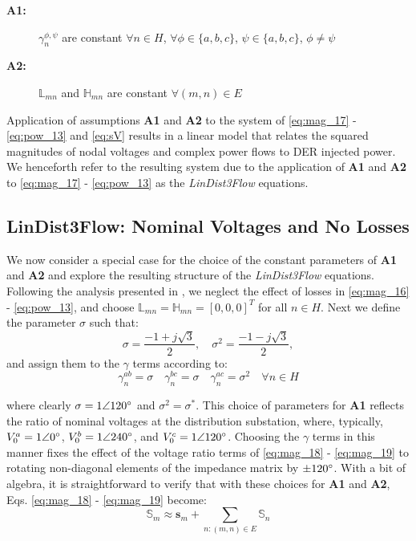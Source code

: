 \begin{description}
	\item[\textbf{A1:} ] $\gamma_{n}^{\phi,\psi}$ are constant $\forall n \in H$, $\forall \phi \in \{a,b,c\}$, $\psi \in \{a,b,c\}$,  $\phi \ne \psi$
    \item[\textbf{A2:} ] $\mathbb{L}_{mn}$ and $\mathbb{H}_{mn}$ are constant $\forall (m,n) \in E$
\end{description}

Application of assumptions \textbf{A1} and \textbf{A2} to the system of \eqref{eq:mag_17} - \eqref{eq:pow_13} and \eqref{eq:sV} results in a linear model that relates the squared magnitudes of nodal voltages and complex power flows to DER injected power.  We henceforth refer to the resulting system due to the application of \textbf{A1} and \textbf{A2} to \eqref{eq:mag_17} - \eqref{eq:pow_13} as the \emph{LinDist3Flow} equations.  

\subsection{LinDist3Flow: Nominal Voltages and No Losses}
\label{subsec:analysis_nominal}

We now consider a special case for the choice of the constant parameters of \textbf{A1} and \textbf{A2} and explore the resulting structure of the \emph{LinDist3Flow} equations.  Following the analysis presented in \cite{baran1989optimal}, we neglect the effect of losses in \eqref{eq:mag_16} - \eqref{eq:pow_13}, and choose $\mathbb{L}_{mn} = \mathbb{H}_{mn} = [0,0,0]^{T}$ for all $n \in H$.  Next we define the parameter $\sigma$ such that:
\begin{equation}
	\sigma = \frac{-1 + j\sqrt{3}}{2}, \quad \sigma^{2} = \frac{-1 - j\sqrt{3}}{2}
    \label{eq:sigma},
\end{equation}
\noindent and assign them to the $\gamma$ terms according to:
\begin{equation}
	\gamma_{n}^{ab} = \sigma \quad \gamma_{n}^{bc} = \sigma \quad \gamma_{n}^{ac} = \sigma^{2} \quad \forall n \in H
    \label{eq:gamma}
\end{equation}

\noindent where clearly $\sigma = 1 \angle 120\degree$ and $\sigma^{2} = \sigma^{*}$.  This choice of parameters for \textbf{A1} reflects the ratio of nominal voltages at the distribution substation, where, typically, $V_{0}^{a} = 1\angle 0 \degree$, $V_{0}^{b} = 1\angle 240 \degree$, and $V_{0}^{c} = 1\angle 120 \degree$.  Choosing the $\gamma$ terms in this manner fixes the effect of the voltage ratio terms of \eqref{eq:mag_18} - \eqref{eq:mag_19} to rotating non-diagonal elements of the impedance matrix by $ \pm 120 \degree$.  With a bit of algebra, it is straightforward to verify that with these choices for \textbf{A1} and \textbf{A2}, Eqs. \eqref{eq:mag_18} - \eqref{eq:mag_19} become:
\begin{equation}
	\mathbb{S}_{m} \approx \mathbf{s}_{m} + \sum_{n:(m,n) \in E} \mathbb{S}_{n}
    \label{eq:pow_12_lin}
\end{equation}

